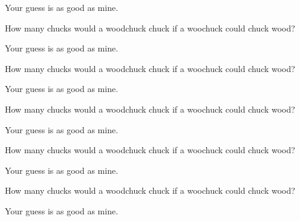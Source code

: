 \documentclass[12pt]{article}
\newenvironment{question}[2][Q]{\begin{trivlist}
\item[\hskip \labelsep {\bfseries #1}\hskip \labelsep {\bfseries #2.}]}{\end{trivlist}}
\newenvironment{answer}[2][A]{\begin{trivlist}
\item[\hskip \labelsep {\bfseries #1}\hskip \labelsep {\bfseries #2.}]}{\end{trivlist}}
\begin{document}
\begin{answer}{31}
Your guess is as good as mine.
\end{answer}
\begin{question}{32}
  How many chucks would a woodchuck chuck if a woochuck could chuck wood?
\end{question}

\begin{answer}{32}
Your guess is as good as mine.
\end{answer}
\begin{question}{33}
  How many chucks would a woodchuck chuck if a woochuck could chuck wood?
\end{question}

\begin{answer}{33}
Your guess is as good as mine.
\end{answer}
\begin{question}{34}
  How many chucks would a woodchuck chuck if a woochuck could chuck wood?
\end{question}

\begin{answer}{34}
Your guess is as good as mine.
\end{answer}
\begin{question}{35}
  How many chucks would a woodchuck chuck if a woochuck could chuck wood?
\end{question}

\begin{answer}{35}
Your guess is as good as mine.
\end{answer}
\begin{question}{36}
  How many chucks would a woodchuck chuck if a woochuck could chuck wood?
\end{question}

\begin{answer}{36}
Your guess is as good as mine.
\end{answer}


 
\end{document}
